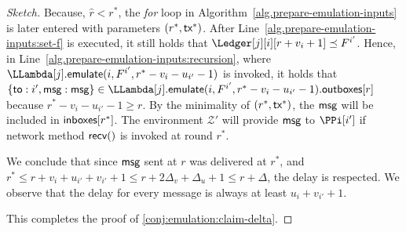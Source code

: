 \begin{proof}[Sketch]
  Because, $\hat{r} < r^*$, the \emph{for} loop in Algorithm~\ref{alg.prepare-emulation-inputs}
  is later entered with parameters $(r^*, \textsf{tx}^*)$.
  After Line~\ref{alg.prepare-emulation-inputs:set-f} is executed,
  it still holds that $\Ledger[j][i][r + v_i + 1] \preceq F^{i'}$.
  Hence, in Line~\ref{alg.prepare-emulation-inputs:recursion}, where
  $\LLambda[j].\emulate(i, F^{i'}, r^* - v_i - u_{i'} - 1)$ is invoked, it holds that
  $\{\textsf{to}: i', \msg: \msg\} \in \LLambda[j].\emulate(i, F^{i'}, r^* - v_i - u_{i'} - 1).\outboxes[r]$
  because $r^* - v_i - u_{i'} - 1 \geq r$.
  By the minimality of $(r^*, \textsf{tx}^*)$, the $\textsf{msg}$ will be included in $\textsf{inboxes}[r^*]$.
  The environment $\mathcal{Z}'$ will provide $\textsf{msg}$ to $\PPi[i']$
  if network method $\textsf{recv}()$ is invoked at round $r^*$.

  We conclude that since $\textsf{msg}$ sent at $r$ was delivered at $r^*$,
  and $r^* \leq r + v_{i} + u_{i'} + v_{i'} + 1 \leq r + 2 \Delta_v + \Delta_u + 1 \leq r + \Delta$, the
  delay is respected. We observe that the delay for every message is always
  at least $u_i + v_{i'} + 1$.

  This completes the proof of \ref{conj:emulation:claim-delta}.





\end{proof}
